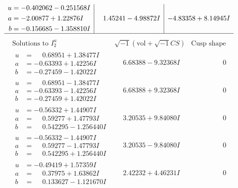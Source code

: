 \documentclass[1p]{elsarticle_modified}
\theoremstyle{definition}
\newcommand{\I}{\sqrt{-1}}
\begin{document}
$$\begin{array}{c|c|c}
\begin{aligned}
u &= -0.402062 - 0.251568 I \\
a &= -2.00877 + 1.22876 I \\
b &= -0.156685 - 1.358810 I\end{aligned}
 & \phantom{-}1.45241 - 4.98872 I & -4.83358 + 8.14945 I\\
 \hline 
 \end{array}$$\newpage$$\begin{array}{c|c|c}  
\text{Solutions to }I^u_{2}& \I (\text{vol} + \sqrt{-1}CS) & \text{Cusp shape}\\
 \hline 
\begin{aligned}
u &= \phantom{-}0.68951 + 1.38477 I \\
a &= -0.63393 + 1.42256 I \\
b &= -0.27459 - 1.42022 I\end{aligned}
 & \phantom{-}6.68388 - 9.32368 I & \phantom{-0.000000 } 0 \\ \hline\begin{aligned}
u &= \phantom{-}0.68951 - 1.38477 I \\
a &= -0.63393 - 1.42256 I \\
b &= -0.27459 + 1.42022 I\end{aligned}
 & \phantom{-}6.68388 + 9.32368 I & \phantom{-0.000000 } 0 \\ \hline\begin{aligned}
u &= -0.56332 + 1.44907 I \\
a &= \phantom{-}0.59277 + 1.47793 I \\
b &= \phantom{-}0.542295 - 1.256440 I\end{aligned}
 & \phantom{-}3.20535 + 9.84080 I & \phantom{-0.000000 } 0 \\ \hline\begin{aligned}
u &= -0.56332 - 1.44907 I \\
a &= \phantom{-}0.59277 - 1.47793 I \\
b &= \phantom{-}0.542295 + 1.256440 I\end{aligned}
 & \phantom{-}3.20535 - 9.84080 I & \phantom{-0.000000 } 0 \\ \hline\begin{aligned}
u &= -0.49419 + 1.57359 I \\
a &= \phantom{-}0.37975 + 1.63862 I \\
b &= \phantom{-}0.133627 - 1.121670 I\end{aligned}
 & \phantom{-}2.42232 + 4.46231 I & \phantom{-0.000000 } 0 \\ \hline\begin{aligned}

\end{aligned}
\end{array}$$
\end{document}
